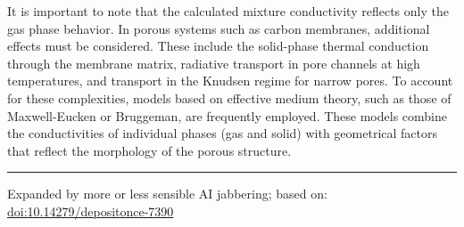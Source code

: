 It is important to note that the calculated mixture conductivity reflects only the gas phase
behavior. In porous systems such as carbon membranes, additional effects must be considered.
These include the solid-phase thermal conduction through the membrane matrix, radiative transport
in pore channels at high temperatures, and transport in the Knudsen regime for narrow pores.
To account for these complexities, models based on effective medium theory, such as those of
Maxwell-Eucken or Bruggeman, are frequently employed. These models combine the conductivities of
individual phases (gas and solid) with geometrical factors that reflect the morphology of the
porous structure.



\noindent\rule[0.5ex]{\linewidth}{1pt}

Expanded by more or less sensible AI jabbering; based on: \href{https://doi.org/10.14279/depositonce-7390}{doi:10.14279/depositonce-7390}

